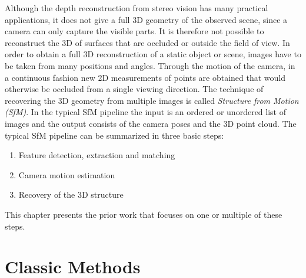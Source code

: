 	Although the depth reconstruction from stereo vision has many practical applications, it does not give a full 3D geometry of the observed scene, since a camera can only capture the visible parts.
	It is therefore not possible to reconstruct the 3D of surfaces that are occluded or outside the field of view. 
	In order to obtain a full 3D reconstruction of a static object or scene, images have to be taken from many positions and angles.
	Through the motion of the camera, in a continuous fashion new 2D measurements of points are obtained that would otherwise be occluded from a single viewing direction.
	The technique of recovering the 3D geometry from multiple images is called \emph{Structure from Motion (SfM)}.
	In the typical SfM pipeline the input is an ordered or unordered list of images and the output consists of the camera poses and the 3D point cloud.
	The typical SfM pipeline can be summarized in three basic steps:
	\begin{enumerate}
		\item Feature detection, extraction and matching
		\item Camera motion estimation
		\item Recovery of the 3D structure
	\end{enumerate}
	This chapter presents the prior work that focuses on one or multiple of these steps.
	
%	
%	

	\section{Classic Methods}

